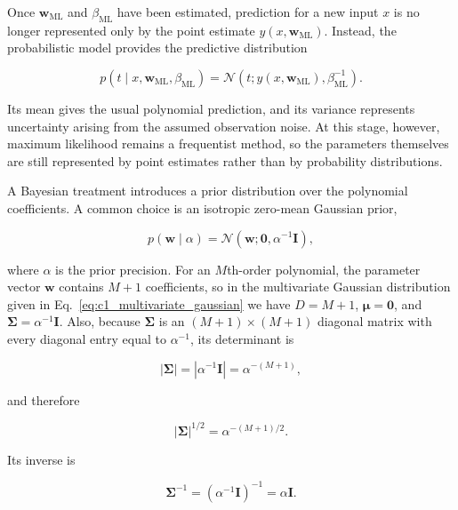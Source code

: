 \documentclass[10pt,twocolumn]{memoir}
\begin{document}
Once $\mathbf{w}_{\mathrm{ML}}$ and $\beta_{\mathrm{ML}}$ have been estimated, prediction for a new input $x$ is no longer represented only by the point estimate $y(x,\mathbf{w}_{\mathrm{ML}})$. Instead, the probabilistic model provides the predictive distribution

\begin{equation}
    p(t\mid x,\mathbf{w}_{\mathrm{ML}},\beta_{\mathrm{ML}}) = \mathcal{N}\left(t;y(x,\mathbf{w}_{\mathrm{ML}}),\beta_{\mathrm{ML}}^{-1}\right).
\end{equation}

Its mean gives the usual polynomial prediction, and its variance represents uncertainty arising from the assumed observation noise. At this stage, however, maximum likelihood remains a frequentist method, so the parameters themselves are still represented by point estimates rather than by probability distributions.

A Bayesian treatment introduces a prior distribution over the polynomial coefficients. A common choice is an isotropic zero-mean Gaussian prior,

\begin{equation}
    p(\mathbf{w}\mid\alpha) = \mathcal{N}\left(\mathbf{w};\mathbf{0},\alpha^{-1}\mathbf{I}\right),
\end{equation}

where $\alpha$ is the prior precision. For an $M$th-order polynomial, the parameter vector $\mathbf{w}$ contains $M+1$ coefficients, so in the multivariate Gaussian distribution given in Eq.~\ref{eq:c1_multivariate_gaussian} we have $D=M+1$, $\boldsymbol{\mu}=\mathbf{0}$, and $\boldsymbol{\Sigma}=\alpha^{-1}\mathbf{I}$. Also, because $\boldsymbol{\Sigma}$ is an $(M+1)\times(M+1)$ diagonal matrix with every diagonal entry equal to $\alpha^{-1}$, its determinant is

\begin{equation}
    \left|\boldsymbol{\Sigma}\right| = \left|\alpha^{-1}\mathbf{I}\right| = \alpha^{-(M+1)},
\end{equation}

and therefore

\begin{equation}
    |\boldsymbol{\Sigma}|^{1/2} = \alpha^{-(M+1)/2}.
\end{equation}

Its inverse is

\begin{equation}
    \boldsymbol{\Sigma}^{-1} = (\alpha^{-1}\mathbf{I})^{-1} = \alpha\mathbf{I}.
\end{equation}
\end{document}
